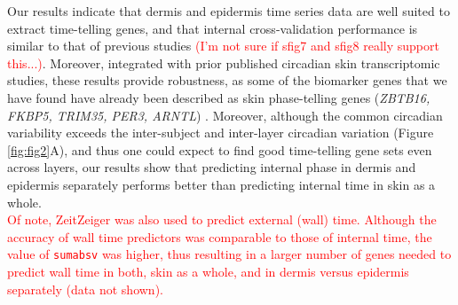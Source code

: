 Our results indicate that dermis and epidermis time series data are well suited to extract time-telling genes, and that internal cross-validation performance is similar to that of previous studies \cite{Wu2018, Wu2020} \textcolor{red}{(I'm not sure if sfig7 and sfig8 really support this...)}. Moreover, integrated with prior published circadian skin transcriptomic studies, these results provide robustness, as some of the biomarker genes that we have found have already been described as skin phase-telling genes (\textit{ZBTB16, FKBP5, TRIM35, PER3, ARNTL}) \cite{Wu2018, Wu2020}. Moreover, although the common circadian variability exceeds the inter-subject and inter-layer circadian variation (Figure \ref{fig:fig2}A), and thus one could expect to find good time-telling gene sets even across layers, our results show that predicting internal phase in dermis and epidermis separately performs better than predicting internal time in skin as a whole. \\

\textcolor{red}{Of note, ZeitZeiger was also used to predict external (wall) time. Although the accuracy of wall time predictors was comparable to those of internal time, the value of \texttt{sumabsv} was higher, thus resulting in a larger number of genes needed to predict wall time in both, skin as a whole, and in dermis versus epidermis separately (data not shown).}\\



